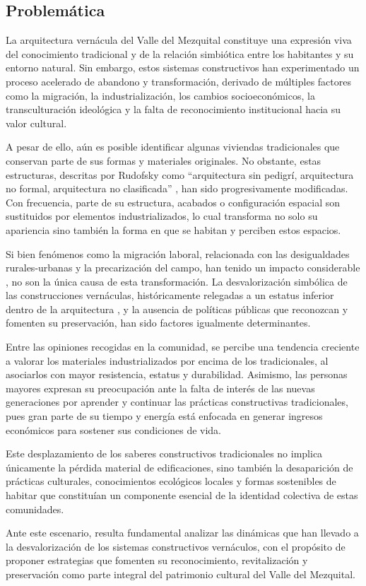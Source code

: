\subsection{Problemática}

La arquitectura vernácula del Valle del Mezquital constituye una expresión viva del conocimiento tradicional y de la relación simbiótica entre los habitantes y su entorno natural. Sin embargo, estos sistemas constructivos han experimentado un proceso acelerado de abandono y transformación, derivado de múltiples factores como la migración, la industrialización, los cambios socioeconómicos, la transculturación ideológica y la falta de reconocimiento institucional hacia su valor cultural.

A pesar de ello, aún es posible identificar algunas viviendas tradicionales que conservan parte de sus formas y materiales originales. No obstante, estas estructuras, descritas por Rudofsky como ``arquitectura sin pedigrí, arquitectura no formal, arquitectura no clasificada'' \citep[p. 9]{rudofsky1964}, han sido progresivamente modificadas. Con frecuencia, parte de su estructura, acabados o configuración espacial son sustituidos por elementos industrializados, lo cual transforma no solo su apariencia sino también la forma en que se habitan y perciben estos espacios.

Si bien fenómenos como la migración laboral, relacionada con las desigualdades rurales-urbanas y la precarización del campo, han tenido un impacto considerable \citep{monroy2009, boils2010dadho}, no son la única causa de esta transformación. La desvalorización simbólica de las construcciones vernáculas, históricamente relegadas a un estatus inferior dentro de la arquitectura \citep[p. 2]{torres1999revista}, y la ausencia de políticas públicas que reconozcan y fomenten su preservación, han sido factores igualmente determinantes.

Entre las opiniones recogidas en la comunidad, se percibe una tendencia creciente a valorar los materiales industrializados por encima de los tradicionales, al asociarlos con mayor resistencia, estatus y durabilidad. Asimismo, las personas mayores expresan su preocupación ante la falta de interés de las nuevas generaciones por aprender y continuar las prácticas constructivas tradicionales, pues gran parte de su tiempo y energía está enfocada en generar ingresos económicos para sostener sus condiciones de vida.

Este desplazamiento de los saberes constructivos tradicionales no implica únicamente la pérdida material de edificaciones, sino también la desaparición de prácticas culturales, conocimientos ecológicos locales y formas sostenibles de habitar que constituían un componente esencial de la identidad colectiva de estas comunidades.

Ante este escenario, resulta fundamental analizar las dinámicas que han llevado a la desvalorización de los sistemas constructivos vernáculos, con el propósito de proponer estrategias que fomenten su reconocimiento, revitalización y preservación como parte integral del patrimonio cultural del Valle del Mezquital.
